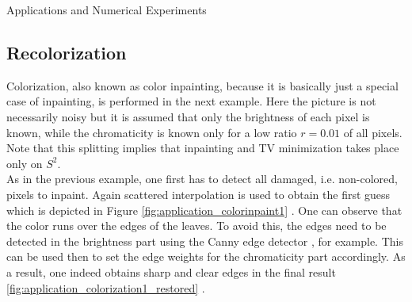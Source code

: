 \begin{chapter}{Applications and Numerical Experiments}


\FloatBarrier
\subsection{Recolorization} %
\label{sub:Recolorization}
Colorization, also known as color inpainting, because it is basically just a special case of inpainting, is performed in the next example.
Here the picture is not necessarily noisy but it is assumed that only the brightness of each pixel is known, while the chromaticity is known only for a low ratio $r=0.01$ of all pixels.
Note that this splitting implies that inpainting and TV minimization takes place only on $S^2$.\\

As in the previous example, one first has to detect all damaged, i.e. non-colored, pixels to inpaint. Again scattered interpolation is
used to obtain the first guess which is depicted
in Figure \ref{fig:application_colorinpaint1} . One can observe that the color runs over the edges of the leaves. To avoid this, the edges need to be detected in the brightness part using the Canny edge detector \cite{Canny}, for example. This
can be used then to set the edge weights for the chromaticity part accordingly. As a result, one indeed
obtains sharp and clear edges in the final result \ref{fig:application_colorization1_restored} .


\end{chapter}
